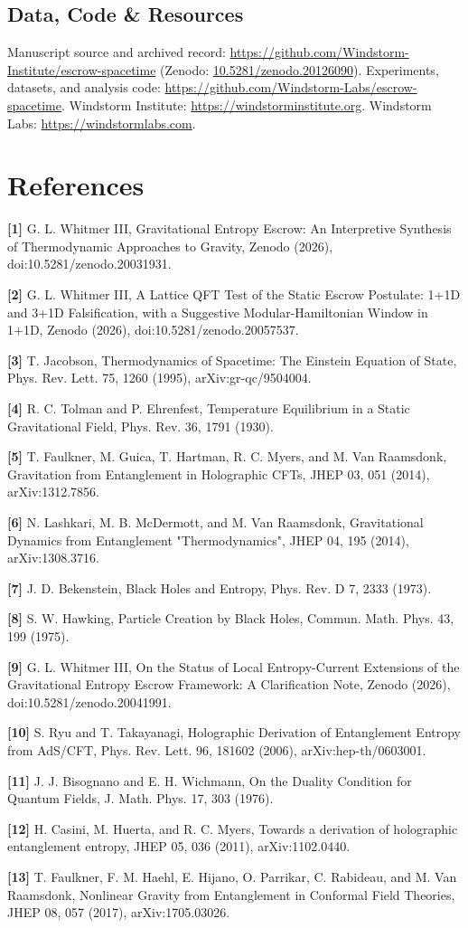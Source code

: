 \documentclass[11pt]{article}
\begin{document}
\subsection*{Data, Code \& Resources}
\noindent Manuscript source and archived record: \url{https://github.com/Windstorm-Institute/escrow-spacetime} (Zenodo: \href{https://doi.org/10.5281/zenodo.20126090}{10.5281/zenodo.20126090}). Experiments, datasets, and analysis code: \url{https://github.com/Windstorm-Labs/escrow-spacetime}. Windstorm Institute: \url{https://windstorminstitute.org}. Windstorm Labs: \url{https://windstormlabs.com}.

\section*{References}
\small

\textbf{[1]} G. L. Whitmer III, Gravitational Entropy Escrow: An
Interpretive Synthesis of Thermodynamic Approaches to Gravity, Zenodo
(2026), doi:10.5281/zenodo.20031931.

\textbf{[2]} G. L. Whitmer III, A Lattice QFT Test of
the Static Escrow Postulate: 1+1D and 3+1D Falsification, with a
Suggestive Modular-Hamiltonian Window in 1+1D, Zenodo (2026),
doi:10.5281/zenodo.20057537.

\textbf{[3]} T. Jacobson, Thermodynamics of Spacetime: The Einstein
Equation of State, Phys. Rev. Lett. 75, 1260 (1995),
arXiv:gr-qc/9504004.

\textbf{[4]} R. C. Tolman and P. Ehrenfest, Temperature Equilibrium in a
Static Gravitational Field, Phys. Rev. 36, 1791 (1930).

\textbf{[5]} T. Faulkner, M. Guica, T. Hartman, R. C. Myers, and M. Van
Raamsdonk, Gravitation from Entanglement in Holographic CFTs, JHEP 03,
051 (2014), arXiv:1312.7856.

\textbf{[6]} N. Lashkari, M. B. McDermott, and M. Van Raamsdonk,
Gravitational Dynamics from Entanglement "Thermodynamics", JHEP 04,
195 (2014), arXiv:1308.3716.

\textbf{[7]} J. D. Bekenstein, Black Holes and Entropy, Phys. Rev. D 7,
2333 (1973).

\textbf{[8]} S. W. Hawking, Particle Creation by Black Holes, Commun.
Math. Phys. 43, 199 (1975).

\textbf{[9]} G. L. Whitmer III, On the Status of Local Entropy-Current
Extensions of the Gravitational Entropy Escrow Framework: A
Clarification Note, Zenodo (2026), doi:10.5281/zenodo.20041991.

\textbf{[10]} S. Ryu and T. Takayanagi, Holographic Derivation of
Entanglement Entropy from AdS/CFT, Phys. Rev. Lett. 96, 181602 (2006),
arXiv:hep-th/0603001.

\textbf{[11]} J. J. Bisognano and E. H. Wichmann, On the Duality
Condition for Quantum Fields, J. Math. Phys. 17, 303 (1976).

\textbf{[12]} H. Casini, M. Huerta, and R. C. Myers, Towards a derivation
of holographic entanglement entropy, JHEP 05, 036 (2011),
arXiv:1102.0440.

\textbf{[13]} T. Faulkner, F. M. Haehl, E. Hijano, O. Parrikar, C.
Rabideau, and M. Van Raamsdonk, Nonlinear Gravity from Entanglement in
Conformal Field Theories, JHEP 08, 057 (2017), arXiv:1705.03026.
\end{document}
